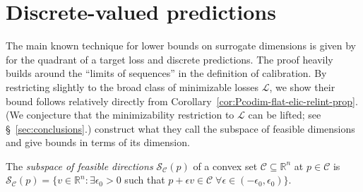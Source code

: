 \documentclass[anon,12pt]{colt2021} %
\newcommand{\Comments}{1}
\newcommand{\mynote}[2]{\ifnum\Comments=1\textcolor{#1}{#2}\fi}
\newcommand{\mytodo}[2]{\ifnum\Comments=1%
	\todo[linecolor=#1!80!black,backgroundcolor=#1,bordercolor=#1!80!black]{#2}\fi}
\newcommand{\jessiet}[1]{\mytodo{purple!20!white}{JF: #1}}
\newcommand{\bo}[1]{\mynote{blue}{[Bo: #1]}}
\newcommand{\reals}{\mathbb{R}}
\newcommand{\C}{\mathcal{C}}
\renewcommand{\L}{\mathcal{L}}
\newcommand{\Sc}{\mathcal{S}}  %
\begin{document}

\section{Discrete-valued predictions}\label{sec:finite-calib}

The main known technique for lower bounds on surrogate dimensions is given by \citet{ramaswamy2016convex} for the quadrant of a target loss and discrete predictions.
The proof heavily builds around the ``limits of sequences'' in the definition of calibration.
By restricting slightly to the broad class of minimizable losses $\L$, we show their bound follows relatively directly from Corollary~\ref{cor:Pcodim-flat-elic-relint-prop}.
(We conjecture that the minimizability restriction to $\L$ can be lifted; see \S~\ref{sec:conclusions}.)
\citet{ramaswamy2016convex} construct what they call the subspace of feasible dimensions and give bounds in terms of its dimension.
\begin{definition}\label{def:subspace-feas}
	The \emph{subspace of feasible directions} $\Sc_\C(p)$ of a convex set $\C \subseteq \reals^n$ at $p \in \C$ is $\Sc_\C(p) = \{ v \in \reals^n : \exists \epsilon_0 > 0 $ such that $p + \epsilon v \in \C \; \forall \epsilon \in (-\epsilon_0,\epsilon_0) \}$.
\end{definition}
\end{document}
